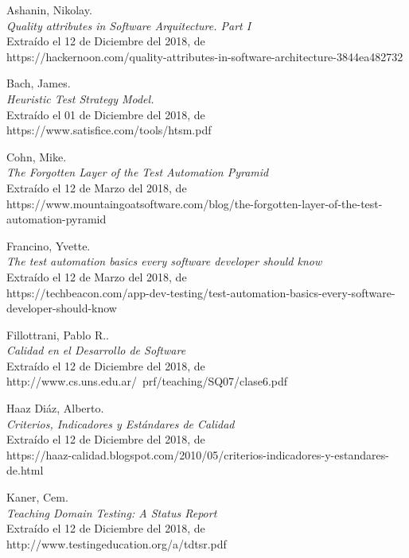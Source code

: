 \begin{thebibliography}{99}

 Ashanin, Nikolay.\\
\emph{Quality attributes in Software Arquitecture. Part I}\\
Extraído el 12 de Diciembre del 2018, de\\
https://hackernoon.com/quality-attributes-in-software-architecture-3844ea482732

 Bach, James.\\
\emph{Heuristic Test Strategy Model.}\\
Extraído el 01 de Diciembre del 2018, de\\
https://www.satisfice.com/tools/htsm.pdf

 Cohn, Mike.\\
\emph{The Forgotten Layer of the Test Automation Pyramid}\\
Extraído el 12 de Marzo del 2018, de\\
https://www.mountaingoatsoftware.com/blog/the-forgotten-layer-of-the-test-automation-pyramid

 Francino, Yvette.\\
\emph{The test automation basics every software developer should know}\\
Extraído el 12 de Marzo del 2018, de\\
https://techbeacon.com/app-dev-testing/test-automation-basics-every-software-developer-should-know

 Fillottrani, Pablo R..\\
\emph{Calidad en el Desarrollo de Software}\\
Extraído el 12 de Diciembre del 2018, de\\
http://www.cs.uns.edu.ar/~prf/teaching/SQ07/clase6.pdf

 Haaz Diáz, Alberto.\\
\emph{Criterios, Indicadores y Estándares de Calidad}\\
Extraído el 12 de Diciembre del 2018, de\\
https://haaz-calidad.blogspot.com/2010/05/criterios-indicadores-y-estandares-de.html

 Kaner, Cem.\\
\emph{Teaching Domain Testing: A Status Report}\\
Extraído el 12 de Diciembre del 2018, de\\
http://www.testingeducation.org/a/tdtsr.pdf


\end{thebibliography}
